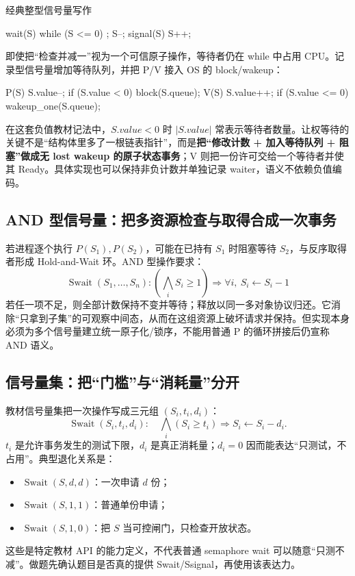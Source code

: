 \documentclass[11pt,a4paper]{ctexart}
\newcommand{\kw}[1]{\textbf{#1}}
\begin{document}
经典整型信号量写作
\begin{codeblock}
wait(S)   { while (S <= 0) ; S--; }
signal(S) { S++; }
\end{codeblock}
即使把“检查并减一”视为一个可信原子操作，等待者仍在 while 中占用 CPU。记录型信号量增加等待队列，并把 P/V 接入 OS 的 block/wakeup：
\begin{codeblock}
P(S) {
    S.value--;
    if (S.value < 0) block(S.queue);
}
V(S) {
    S.value++;
    if (S.value <= 0) wakeup_one(S.queue);
}
\end{codeblock}
在这套负值教材记法中，$S.value<0$ 时 $|S.value|$ 常表示等待者数量。让权等待的关键不是“结构体里多了一根链表指针”，而是\kw{把“修改计数 + 加入等待队列 + 阻塞”做成无 lost wakeup 的原子状态事务}；V 则把一份许可交给一个等待者并使其 Ready。具体实现也可以保持非负计数并单独记录 waiter，语义不依赖负值编码。

\subsection{AND 型信号量：把多资源检查与取得合成一次事务}

若进程逐个执行 $P(S_1),P(S_2)$，可能在已持有 $S_1$ 时阻塞等待 $S_2$，与反序取得者形成 Hold-and-Wait 环。AND 型操作要求：
\[
\boxed{
\operatorname{Swait}(S_1,\ldots,S_n):
\left(\bigwedge_i S_i\ge1\right)
\Rightarrow
\forall i,\ S_i\leftarrow S_i-1
}
\]
若任一项不足，则全部计数保持不变并等待；释放以同一多对象协议归还。它消除“只拿到子集”的可观察中间态，从而在这组资源上破坏请求并保持。但实现本身必须为多个信号量建立统一原子化/锁序，不能用普通 P 的循环拼接后仍宣称 AND 语义。

\subsection{信号量集：把“门槛”与“消耗量”分开}

教材信号量集把一次操作写成三元组 $(S_i,t_i,d_i)$：
\[
\operatorname{Swait}(S_i,t_i,d_i):
\quad
\bigwedge_i(S_i\ge t_i)
\Rightarrow
S_i\leftarrow S_i-d_i.
\]
$t_i$ 是允许事务发生的测试下限，$d_i$ 是真正消耗量；$d_i=0$ 因而能表达“只测试，不占用”。典型退化关系是：
\begin{itemize}
\item $\operatorname{Swait}(S,d,d)$：一次申请 $d$ 份；
\item $\operatorname{Swait}(S,1,1)$：普通单份申请；
\item $\operatorname{Swait}(S,1,0)$：把 $S$ 当可控闸门，只检查开放状态。
\end{itemize}
这些是特定教材 API 的能力定义，不代表普通 semaphore wait 可以随意“只测不减”。做题先确认题目是否真的提供 Swait/Ssignal，再使用该表达力。
\end{document}
